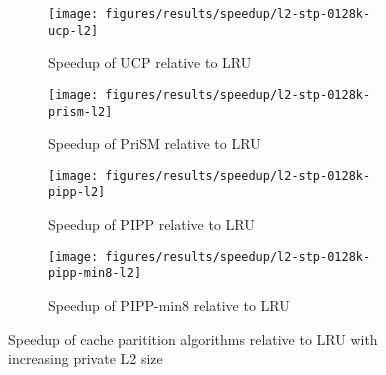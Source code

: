 \begin{figure}[H]
	\ContinuedFloat
    \begin{subfigure}[b]{0.5\textwidth}
        \texttt{[image: figures/results/speedup/l2-stp-0128k-ucp-l2]}
        \caption{Speedup of UCP relative to LRU}
        \label{fig:results:l2:ucp}
    \end{subfigure}%
    \begin{subfigure}[b]{0.5\textwidth}
        \texttt{[image: figures/results/speedup/l2-stp-0128k-prism-l2]}
        \caption{Speedup of PriSM relative to LRU}
        \label{fig:results:l2:prism}
    \end{subfigure}
    \begin{subfigure}[b]{0.5\textwidth}
        \texttt{[image: figures/results/speedup/l2-stp-0128k-pipp-l2]}
        \caption{Speedup of PIPP relative to LRU}
        \label{fig:results:l2:pipp}
    \end{subfigure}%
    \begin{subfigure}[b]{0.5\textwidth}
        \texttt{[image: figures/results/speedup/l2-stp-0128k-pipp-min8-l2]}
        \caption{Speedup of PIPP-min8 relative to LRU}
        \label{fig:results:l2:pipp-min8}
    \end{subfigure}
    \caption{Speedup of cache paritition algorithms relative to LRU with increasing private L2 size}
    \label{fig:results:l2}
\end{figure}